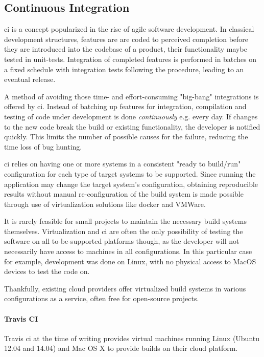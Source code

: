 \subsection{Continuous Integration}
\gls{ci} is a concept popularized in the rise of agile software development. In classical development structures, features are are coded to perceived completion before they are introduced into the codebase of a product, their functionality maybe tested in unit-tests. Integration of completed features is performed in batches on a fixed schedule with integration tests following the procedure, leading to an eventual release.

A method of avoiding those time- and effort-consuming "big-bang" integrations is offered by \gls{ci}. Instead of batching up features for integration, compilation and testing of code under development is done \textit{continuously} e.g. every day. If changes to the new code break the build or existing functionality, the developer is notified quickly. This limits the number of possible causes for the failure, reducing the time loss of bug hunting.

\gls{ci} relies on having one or more systems in a consistent "ready to build/run" configuration for each type of target systems to be supported. Since running the application may change the target system's configuration, obtaining reproducible results without manual re-configuration of the build system is made possible through use of virtualization solutions like docker and VMWare.

It is rarely feasible for small projects to maintain the necessary build systems themselves. Virtualization and \gls{ci} are often the only possibility of testing the software on all to-be-supported platforms though, as the developer will not necessarily have access to machines in all configurations. In this particular case for example, development was done on Linux, with no physical access to MacOS devices to test the code on.

Thankfully, existing \gls{cloud} providers offer virtualized build systems in various configurations as a service, often free for open-source projects.

\paragraph{Travis CI}
Travis \gls{ci} at the time of writing provides virtual machines running Linux (Ubuntu 12.04 and 14.04) and Mac OS X to provide builds on their \gls{cloud} platform.

